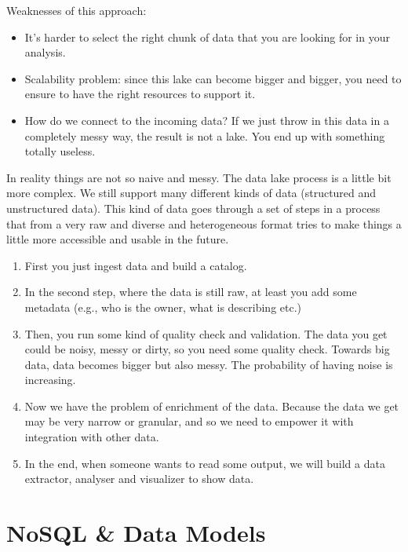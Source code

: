 \documentclass[10pt,a4paper]{article}
\begin{document}
Weaknesses of this approach:
\begin{itemize}
	\item It’s harder to select the right chunk of data that you are looking for in your analysis.
	\item Scalability problem: since this lake can become bigger and bigger, you need to ensure to have the right resources to support it.
	\item How do we connect to the incoming data? If we just throw in this data in a completely messy way, the result is not a lake. You end up with something totally useless.
\end{itemize}
In reality things are not so naive and messy. The data lake process is a little bit more complex. We still support many different kinds of data (structured and unstructured data). This kind of data goes through a set of steps in a process that from a very raw and diverse and heterogeneous format tries to make things a little more accessible and usable in the future.
\begin{enumerate}
	\item First you just ingest data and build a catalog.
	\item In the second step, where the data is still raw, at least you add some metadata (e.g., who is the owner, what is describing etc.)
	\item Then, you run some kind of quality check and validation. The data you get could be noisy, messy or dirty, so you need some quality check. Towards big data, data becomes bigger but also messy. The probability of having noise is increasing.
	\item Now we have the problem of enrichment of the data. Because the data we get may be very narrow or granular, and so we need to empower it with integration with other data.
	\item In the end, when someone wants to read some output, we will build a data extractor, analyser and visualizer to show data.
\end{enumerate}

\pagebreak

\section{NoSQL \& Data Models}
\end{document}
